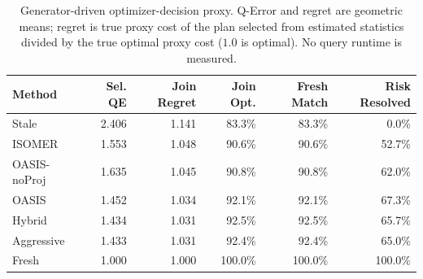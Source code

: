 \begin{table}[t]
  \centering
  \small
  \caption{Generator-driven optimizer-decision proxy. Q-Error and regret are geometric means; regret is true proxy cost of the plan selected from estimated statistics divided by the true optimal proxy cost ($1.0$ is optimal). No query runtime is measured.}
  \label{tab:optimizer_decision_proxy}
  \setlength{\tabcolsep}{4pt}
  \begin{tabular}{lrrrrr}
    \toprule
    Method & Sel. QE & Join Regret & Join Opt. & Fresh Match & Risk Resolved \\
    \midrule
    Stale & 2.406 & 1.141 & 83.3\% & 83.3\% & 0.0\% \\
    ISOMER & 1.553 & 1.048 & 90.6\% & 90.6\% & 52.7\% \\
    OASIS-noProj & 1.635 & 1.045 & 90.8\% & 90.8\% & 62.0\% \\
    OASIS & 1.452 & 1.034 & 92.1\% & 92.1\% & 67.3\% \\
    Hybrid & 1.434 & 1.031 & 92.5\% & 92.5\% & 65.7\% \\
    Aggressive & 1.433 & 1.031 & 92.4\% & 92.4\% & 65.0\% \\
    Fresh & 1.000 & 1.000 & 100.0\% & 100.0\% & 100.0\% \\
    \bottomrule
  \end{tabular}
\end{table}
